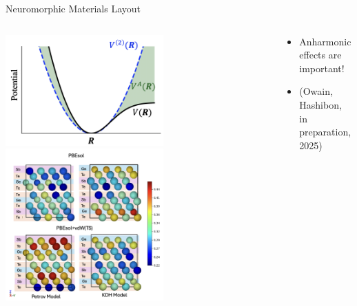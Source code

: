 \documentclass[aspectratio=169]{beamer}
\begin{document}
\begin{frame}{Neuromorphic Materials Layout}
\begin{columns}[T]
    \begin{column}{0.33\textwidth}
      \begin{minipage}[t]{\linewidth}
        \centering
        \includegraphics[width=0.6\textwidth]{media/harmonic.png}\\[1ex]
        \includegraphics[width=0.6\textwidth]{media/pbesol_gst.png}
      \end{minipage}
    \end{column}

    \begin{column}{0.33\textwidth}
      \small
      \begin{itemize}
        \item Anharmonic effects are important!
        \item (Owain, Hashibon, in preparation, 2025)
      \end{itemize}
    \end{column}

  \end{columns}
\end{frame}

\end{document}
